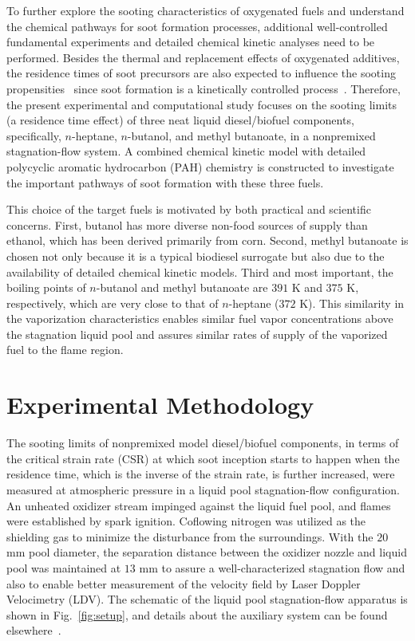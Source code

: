 \documentclass[review,3p,times]{elsarticleUS}
\begin{document}
To further explore the sooting characteristics of oxygenated fuels and understand the chemical pathways for soot formation processes, additional well-controlled fundamental experiments and detailed chemical kinetic analyses need to be performed.  Besides the thermal and replacement effects of oxygenated additives, the residence times of soot precursors are also expected to influence the sooting propensities~\cite{tsuji71} since soot formation is a kinetically controlled process~\cite{vandsburger85}.  Therefore, the present experimental and computational study focuses on the sooting limits (a residence time effect) of three neat liquid diesel/biofuel components, specifically, $n$-heptane, $n$-butanol, and methyl butanoate, in a nonpremixed stagnation-flow system. A combined chemical kinetic model with detailed polycyclic aromatic hydrocarbon (PAH) chemistry is constructed to investigate the important pathways of soot formation with these three fuels.

This choice of the target fuels is motivated by both practical and scientific concerns. First, butanol has more diverse non-food sources of supply than ethanol, which has been derived primarily from corn. Second, methyl butanoate is chosen not only because it is a typical biodiesel surrogate but also due to the availability of detailed chemical kinetic models. Third and most important, the boiling points of $n$-butanol and methyl butanoate are $391$ K and $375$ K, respectively, which are very close to that of $n$-heptane ($372$ K). This similarity in the vaporization characteristics enables similar fuel vapor concentrations above the stagnation liquid pool and assures similar rates of supply of the vaporized fuel to the flame region.


\section{Experimental Methodology}
\label{sec:2}

The sooting limits of nonpremixed model diesel/biofuel components, in terms of the critical strain rate (CSR) at which soot inception starts to happen when the residence time, which is the inverse of the strain rate, is further increased, were measured at atmospheric pressure in a liquid pool stagnation-flow configuration. An unheated oxidizer stream impinged against the liquid fuel pool, and flames were established by spark ignition. Coflowing nitrogen was utilized as the shielding gas to minimize the disturbance from the surroundings.  With the $20$ mm pool diameter, the separation distance between the oxidizer nozzle and liquid pool was maintained at $13$ mm to assure a well-characterized stagnation flow and also to enable better measurement of the velocity field by Laser Doppler Velocimetry (LDV).  The schematic of the liquid pool stagnation-flow apparatus is shown in Fig.~\ref{fig:setup}, and details about the auxiliary system can be found elsewhere~\cite{liu10}.
\end{document}
